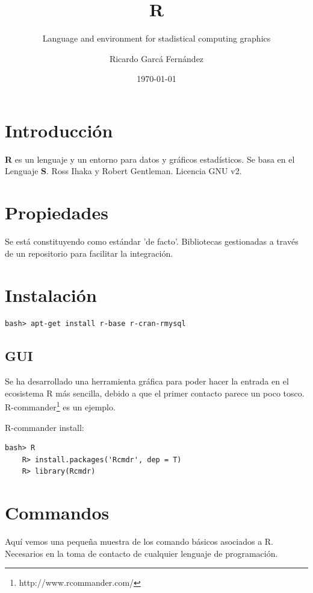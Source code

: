 \documentclass[11pt]{scrartcl}
\title{\textbf{R}}
\subtitle{Language and environment for stadistical computing graphics}
\author{Ricardo Garc\'a Fern\'andez}
\date{\today}
\begin{document}
\maketitle

\section{Introducci\'on}

\textbf{R} es un lenguaje y un entorno para datos y gr\'aficos estad\'isticos.
Se basa en el Lenguaje \textbf{S}. 
Ross Ihaka y Robert Gentleman.
Licencia  GNU v2.

\section{Propiedades}

Se est\'a constituyendo como est\'andar 'de facto'.
Bibliotecas gestionadas a trav\'es de un repositorio para facilitar la integraci\'on.

\section{Instalaci\'on}

\begin{lstlisting}[style=Shell]
	bash> apt-get install r-base r-cran-rmysql
\end{lstlisting}

\subsection{GUI}

Se ha desarrollado una herramienta gr\'afica para poder hacer la entrada en el ecosistema R m\'as sencilla, debido a que el primer contacto parece un poco tosco. R-commander\footnote{http://www.rcommander.com/} es un ejemplo.

R-commander install:

\begin{lstlisting}[style=Shell]
	bash> R
	R> install.packages('Rcmdr', dep = T)
	R> library(Rcmdr)
\end{lstlisting}

\section{Commandos}

Aqu\'i vemos una peque\~na muestra de los comando b\'asicos asociados a R. Necesarios en la toma de contacto de cualquier lenguaje de programaci\'on.
\end{document}
